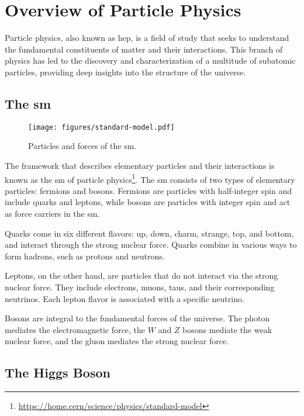 \section{Overview of Particle Physics}

Particle physics, also known as \gls{hep}, is a field of study that seeks to understand the fundamental
constituents of matter and their interactions. This branch of physics has led to the discovery and characterization of a
multitude of subatomic particles, providing deep insights into the structure of the universe.

\subsection[The Standard Model]{The \gls{sm}}

\begin{figure}[htb]
    \centering
    \texttt{[image: figures/standard-model.pdf]}
    \caption{Particles and forces of the \gls{sm}.}
    \label{fig:standard-model}
\end{figure}

The framework that describes elementary particles and their interactions is known as the \gls{sm} of particle
physics\footnote{\url{https://home.cern/science/physics/standard-model}}. The \gls{sm} consists of two types of
elementary particles: fermions and bosons. Fermions are particles with half-integer spin and include quarks and leptons,
while bosons are particles with integer spin and act as force carriers
in the \gls{sm}.

Quarks come in six different flavors: up, down, charm, strange, top, and bottom, and interact
through the strong nuclear force. Quarks combine in various ways to form hadrons, such as protons and neutrons.

Leptons, on the other hand, are particles that do not interact via the strong nuclear force. They include electrons,
muons, taus, and their corresponding neutrinos. Each lepton flavor is associated with a specific neutrino.

Bosons are integral to the fundamental forces of the universe. The photon mediates the electromagnetic force, the $W$
and $Z$ bosons mediate the weak nuclear force, and the gluon mediates the strong nuclear force.

\subsection{The Higgs Boson}

